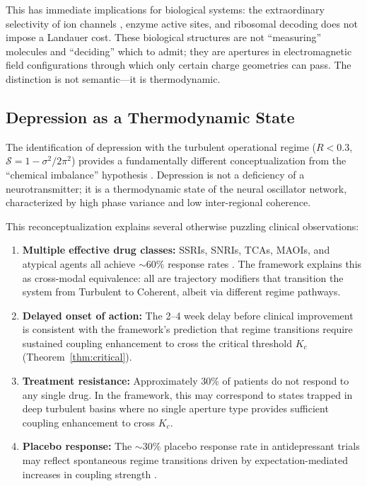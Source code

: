 \documentclass[twocolumn,10pt]{article}
\newcommand{\Rorder}{R}
\begin{document}
This has immediate implications for biological systems: the extraordinary selectivity of ion channels \citep{doyle1998structure, hille2001ion}, enzyme active sites, and ribosomal decoding does not impose a Landauer cost.  These biological structures are not ``measuring'' molecules and ``deciding'' which to admit; they are apertures in electromagnetic field configurations through which only certain charge geometries can pass.  The distinction is not semantic---it is thermodynamic.

\subsection{Depression as a Thermodynamic State}

The identification of depression with the turbulent operational regime ($\Rorder < 0.3$, $\mathcal{S} = 1 - \sigma^{2}/2\pi^{2}$) provides a fundamentally different conceptualization from the ``chemical imbalance'' hypothesis \citep{owens1997role}.  Depression is not a deficiency of a neurotransmitter; it is a thermodynamic state of the neural oscillator network, characterized by high phase variance and low inter-regional coherence.

This reconceptualization explains several otherwise puzzling clinical observations:
\begin{enumerate}[nosep]
  \item \textbf{Multiple effective drug classes:} SSRIs, SNRIs, TCAs, MAOIs, and atypical agents all achieve $\sim\!60\%$ response rates \citep{cipriani2018comparative}.  The framework explains this as cross-modal equivalence: all are trajectory modifiers that transition the system from Turbulent to Coherent, albeit via different regime pathways.
  \item \textbf{Delayed onset of action:} The 2--4 week delay before clinical improvement is consistent with the framework's prediction that regime transitions require sustained coupling enhancement to cross the critical threshold $K_{c}$ (Theorem~\ref{thm:critical}).
  \item \textbf{Treatment resistance:} Approximately 30\% of patients do not respond to any single drug.  In the framework, this may correspond to states trapped in deep turbulent basins where no single aperture type provides sufficient coupling enhancement to cross $K_{c}$.
  \item \textbf{Placebo response:} The $\sim\!30\%$ placebo response rate in antidepressant trials may reflect spontaneous regime transitions driven by expectation-mediated increases in coupling strength \citep{uhlhaas2006neural}.
\end{enumerate}
\end{document}
